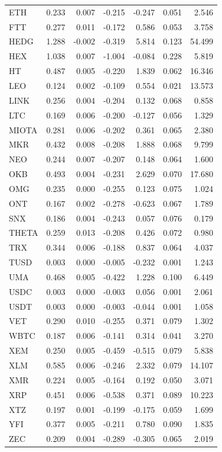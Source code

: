 \documentclass[runningheads,legalpaper,10pt]{etc/llncs}
\begin{document}
\begin{table}[htbp]
\begin{tabular}{lrrrrrr}
    ETH   & 0.233 & 0.007 & -0.215 & -0.247 & 0.051 & 2.546 \\
    FTT   & 0.277 & 0.011 & -0.172 & 0.586 & 0.053 & 3.758 \\
    HEDG  & 1.288 & -0.002 & -0.319 & 5.814 & 0.123 & 54.499 \\
    HEX   & 1.038 & 0.007 & -1.004 & -0.084 & 0.228 & 5.819 \\
    HT    & 0.487 & 0.005 & -0.220 & 1.839 & 0.062 & 16.346 \\
    LEO   & 0.124 & 0.002 & -0.109 & 0.554 & 0.021 & 13.573 \\
    LINK  & 0.256 & 0.004 & -0.204 & 0.132 & 0.068 & 0.858 \\
    LTC   & 0.169 & 0.006 & -0.200 & -0.127 & 0.056 & 1.329 \\
    MIOTA & 0.281 & 0.006 & -0.202 & 0.361 & 0.065 & 2.380 \\
    MKR   & 0.432 & 0.008 & -0.208 & 1.888 & 0.068 & 9.799 \\
    NEO   & 0.244 & 0.007 & -0.207 & 0.148 & 0.064 & 1.600 \\
    OKB   & 0.493 & 0.004 & -0.231 & 2.629 & 0.070 & 17.680 \\
    OMG   & 0.235 & 0.000 & -0.255 & 0.123 & 0.075 & 1.024 \\
    ONT   & 0.167 & 0.002 & -0.278 & -0.623 & 0.067 & 1.789 \\
    SNX   & 0.186 & 0.004 & -0.243 & 0.057 & 0.076 & 0.179 \\
    THETA & 0.259 & 0.013 & -0.208 & 0.426 & 0.072 & 0.980 \\
    TRX   & 0.344 & 0.006 & -0.188 & 0.837 & 0.064 & 4.037 \\
    TUSD  & 0.003 & 0.000 & -0.005 & -0.232 & 0.001 & 1.243 \\
    UMA   & 0.468 & 0.005 & -0.422 & 1.228 & 0.100 & 6.449 \\
    USDC  & 0.003 & 0.000 & -0.003 & 0.056 & 0.001 & 2.061 \\
    USDT  & 0.003 & 0.000 & -0.003 & -0.044 & 0.001 & 1.058 \\
    VET   & 0.290 & 0.010 & -0.255 & 0.371 & 0.079 & 1.302 \\
    WBTC  & 0.187 & 0.006 & -0.141 & 0.314 & 0.041 & 3.270 \\
    XEM   & 0.250 & 0.005 & -0.459 & -0.515 & 0.079 & 5.838 \\
    XLM   & 0.585 & 0.006 & -0.246 & 2.332 & 0.079 & 14.107 \\
    XMR   & 0.224 & 0.005 & -0.164 & 0.192 & 0.050 & 3.071 \\
    XRP   & 0.451 & 0.006 & -0.538 & 0.371 & 0.089 & 10.223 \\
    XTZ   & 0.197 & 0.001 & -0.199 & -0.175 & 0.059 & 1.699 \\
    YFI   & 0.377 & 0.005 & -0.211 & 0.780 & 0.090 & 1.835 \\
    ZEC   & 0.209 & 0.004 & -0.289 & -0.305 & 0.065 & 2.019 \\
    \bottomrule
    \end{tabular}%
  \label{tab:addlabel}%
\end{table}%
\end{document}
